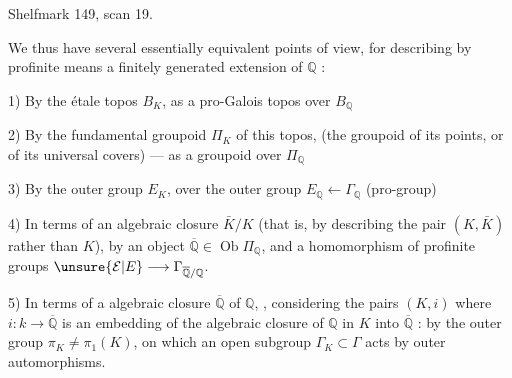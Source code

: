 Shelfmark 149, scan 19.

We thus have several essentially equivalent points of view, for describing by profinite means a finitely generated extension  of $\mathbb Q$ :

1) By the étale topos $B_K$, as a pro-Galois topos over $B_{\mathbb Q}$

2) By the fundamental groupoid $\Pi_K$ of this topos, (the groupoid of its points, or of its universal covers) --- as a groupoid over $\Pi_{\mathbb Q}$

 3) By the outer group $E_K$, over the outer group $E_{\mathbb Q}\longleftarrow\Gamma_{\mathbb Q}$ (pro-group)

4) In terms of an algebraic closure $\bar K/K$ (that is, by describing the pair $(K,\bar K)$ rather than $K$), by an object $\overline{\mathbb Q}\in\operatorname{Ob}\Pi_{\mathbb Q}$, and a homomorphism of profinite groups $\unsure{\mathcal E|E}\longrightarrow\Gamma_{\overline{\mathbb Q}/\mathbb Q}$.

5) In terms of a  algebraic closure $\overline{\mathbb Q}$ of $\mathbb Q$, ,  considering the pairs $(K,i)$ where $i:k\longrightarrow\overline{\mathbb Q}$ is an embedding of the algebraic closure of $\mathbb Q$ in $K$ into $\overline{\mathbb Q}$ :  by the outer group $\pi_K\neq\pi_1(K)$, on which an open subgroup $\Gamma_K\subset\Gamma$ acts by outer automorphisms.

